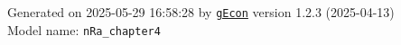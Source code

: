 \documentclass[10pt,a4paper]{article}
\numberwithin{equation}{section}
\begin{document}
\begin{flushleft}{\large
Generated  on 2025-05-29 16:58:28 by \href{http://gecon.r-forge.r-project.org/}{\texttt{gEcon}} version 1.2.3 (2025-04-13)\\
Model name: \verb+nRa_chapter4+
}\end{flushleft}



\end{document}
